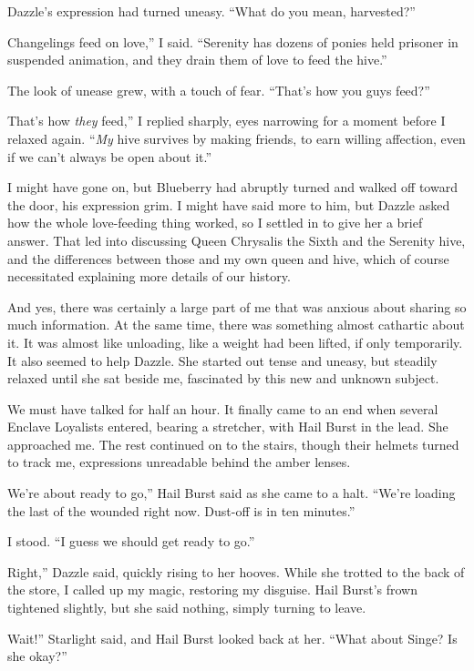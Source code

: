 Dazzle’s expression had turned uneasy. “What do you mean, harvested?”

\leavevmode{}Changelings feed on love,” I said. “Serenity has dozens of ponies held prisoner in suspended animation, and they drain them of love to feed the hive.”

The look of unease grew, with a touch of fear. “That’s how you guys feed?”

\leavevmode{}That’s how \textit{they} feed,” I replied sharply, eyes narrowing for a moment before I relaxed again. “\textit{My} hive survives by making friends, to earn willing affection, even if we can’t always be open about it.”

I might have gone on, but Blueberry had abruptly turned and walked off toward the door, his expression grim. I might have said more to him, but Dazzle asked how the whole love-feeding thing worked, so I settled in to give her a brief answer. That led into discussing Queen Chrysalis the Sixth and the Serenity hive, and the differences between those and my own queen and hive, which of course necessitated explaining more details of our history.

And yes, there was certainly a large part of me that was anxious about sharing so much information. At the same time, there was something almost cathartic about it. It was almost like unloading, like a weight had been lifted, if only temporarily. It also seemed to help Dazzle. She started out tense and uneasy, but steadily relaxed until she sat beside me, fascinated by this new and unknown subject.

We must have talked for half an hour. It finally came to an end when several Enclave Loyalists entered, bearing a stretcher, with Hail Burst in the lead. She approached me. The rest continued on to the stairs, though their helmets turned to track me, expressions unreadable behind the amber lenses.

\leavevmode{}We’re about ready to go,” Hail Burst said as she came to a halt. “We’re loading the last of the wounded right now. Dust-off is in ten minutes.”

I stood. “I guess we should get ready to go.”

\leavevmode{}Right,” Dazzle said, quickly rising to her hooves. While she trotted to the back of the store, I called up my magic, restoring my disguise. Hail Burst’s frown tightened slightly, but she said nothing, simply turning to leave.

\leavevmode{}Wait!” Starlight said, and Hail Burst looked back at her. “What about Singe? Is she okay?”

